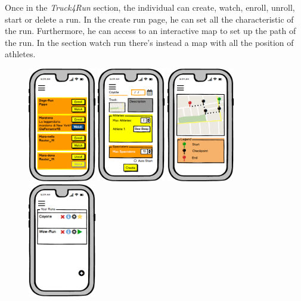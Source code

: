 \documentclass[a4paper]{article}
\begin{document}
Once in the \textit{Truck4Run} section, the individual can create, watch, enroll, unroll, start or delete a run.  In the create run page, he can set all the characteristic of the run. Furthermore, he can access to an interactive map to set up the path of the run. In the section watch run there's instead a map with all the position of athletes.

        \begin{figure}[!htpb]
    	\centering
    	\includegraphics[height=50mm]{images/mockups/RunManager.png}
    	\includegraphics[height=50mm]{images/mockups/RunCreate.png}
    	\includegraphics[height=50mm]{images/mockups/DefineTrack.png}
    	\includegraphics[height=50mm]{images/mockups/MyRuns.png}
        \end{figure}
     \hfill
\end{document}
